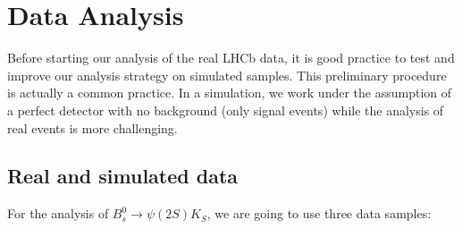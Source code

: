 \chapter{Data Analysis}\label{chap:02}

Before starting our analysis of the real LHCb data, it is good practice to test and improve our analysis strategy on simulated samples. This preliminary procedure is actually a common practice. In a simulation, we work under the assumption of a perfect detector with no background (only signal events) while the analysis of real events is more challenging.

\section{Real and simulated data}

\begin{figure}[H]
    \centering
    \hfill %
    \hfill
    \caption{}
    \label{predatasets}
\end{figure}

For the analysis of $B_{s}^{0}\rightarrow \psi(2S)K_{S}$, we are going to use three data samples:

